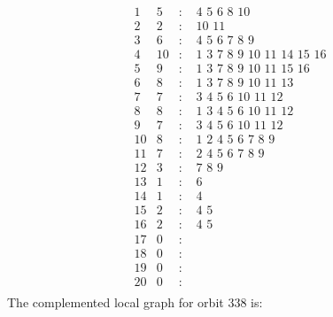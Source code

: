 \documentclass[12pt]{article}
\begin{document}
\begin{equation*}
\begin{array}{rrcl}
1&5&:&\,\,4\,\,5\,\,6\,\,8\,\,10\\
2&2&:&\,\,10\,\,11\\
3&6&:&\,\,4\,\,5\,\,6\,\,7\,\,8\,\,9\\
4&10&:&\,\,1\,\,3\,\,7\,\,8\,\,9\,\,10\,\,11\,\,14\,\,15\,\,16\\
5&9&:&\,\,1\,\,3\,\,7\,\,8\,\,9\,\,10\,\,11\,\,15\,\,16\\
6&8&:&\,\,1\,\,3\,\,7\,\,8\,\,9\,\,10\,\,11\,\,13\\
7&7&:&\,\,3\,\,4\,\,5\,\,6\,\,10\,\,11\,\,12\\
8&8&:&\,\,1\,\,3\,\,4\,\,5\,\,6\,\,10\,\,11\,\,12\\
9&7&:&\,\,3\,\,4\,\,5\,\,6\,\,10\,\,11\,\,12\\
10&8&:&\,\,1\,\,2\,\,4\,\,5\,\,6\,\,7\,\,8\,\,9\\
11&7&:&\,\,2\,\,4\,\,5\,\,6\,\,7\,\,8\,\,9\\
12&3&:&\,\,7\,\,8\,\,9\\
13&1&:&\,\,6\\
14&1&:&\,\,4\\
15&2&:&\,\,4\,\,5\\
16&2&:&\,\,4\,\,5\\
17&0&:&\\
18&0&:&\\
19&0&:&\\
20&0&:&\\
\end{array}
\end{equation*}
The complemented local graph for orbit $338$ is:
\end{document}

